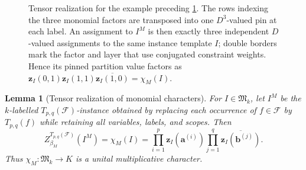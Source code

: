 \documentclass[11pt]{article}
\theoremstyle{plain}
\newtheorem{lemma}[lemma]{Lemma}
\theoremstyle{definition}
\theoremstyle{remark}
\newcommand{\cF}{\mathcal F}
\newcommand{\zvec}[1]{\mathbf z_{#1}}
\newcommand{\InstMonoid}[1]{\mathfrak M_{#1}}
\begin{document}
\begin{figure}[!t]
{%
  }
  \caption{Tensor realization for the example preceding
  \cref{lem:tensor-character}.  The rows indexing the three monomial factors
  are transposed into one $D^3$-valued pin at each label.  An assignment to
  $I^M$ is then exactly three independent $D$-valued assignments to the same
  instance template $I$; double borders mark the factor and layer that use
  conjugated constraint weights.
  Hence its pinned partition value factors as
  $\zvec I(0,1)\zvec I(1,1)\overline{\zvec I(1,0)}=\chi_M(I)$.}
  \label{fig:tensor-character-layers}
\end{figure}

\begin{lemma}[Tensor realization of monomial characters]
\label{lem:tensor-character}
For $I\in\InstMonoid{k}$, let $I^M$ be the $k$-labelled
$T_{p,q}(\cF)$-instance obtained by replacing each occurrence of
$f\in\cF$ by $T_{p,q}(f)$ while retaining all variables, labels, and scopes.
Then
\begin{equation*}
  Z_{\beta_M}^{T_{p,q}(\cF)}(I^M)
  =\chi_M(I)
  =\prod_{i=1}^{p}\zvec I(\mathbf a^{(i)})
    \prod_{j=1}^{q}\overline{\zvec I(\mathbf b^{(j)})}.
\end{equation*}
Thus $\chi_M:\InstMonoid{k}\to K$ is a unital multiplicative character.
\end{lemma}
\end{document}
